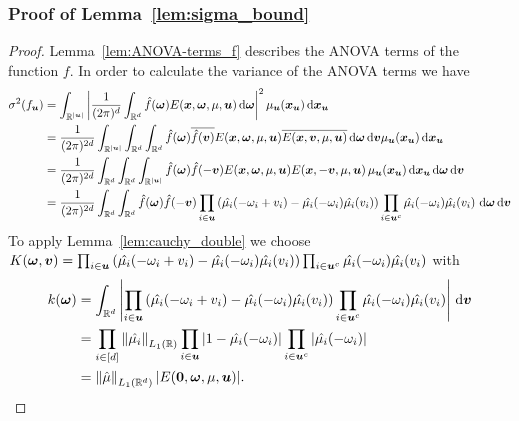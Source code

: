 \documentclass{article}
\renewcommand{\vec}[1]{\ensuremath \mathbf{\boldsymbol{#1}}}
\newcommand{\w}{\ensuremath{\vec \omega}}
\newcommand{\x}{\ensuremath{\vec x}}
\newcommand{\R}{\ensuremath{\mathbb{R}}}
\renewcommand{\d}{\, \mathrm{d}}
\newcommand{\norm}[1]{\left\lVert {#1} \right\rVert}    %
\theoremstyle{definition}
\numberwithin{equation}{section}
\begin{document}
\subsubsection*{Proof of Lemma~\ref{lem:sigma_bound}}
\begin{proof}
Lemma~\ref{lem:ANOVA-terms_f} describes the ANOVA terms of the function $f$. In order to calculate the variance of the ANOVA terms we have
\begin{align*}
\sigma^2(f_{\vec u})
&= \int_{\R^{|\vec u|}}\left|\frac{1}{(2\pi)^d}\int_{\R^d} \hat{f}(\w) E(\x,\w,\mu, \vec u) \d \w\right|^2 \mu_{\vec u}(\vec x_{\vec u})\d \vec x_{\vec u}\\
&=\frac{1}{(2\pi)^{2d}}\int_{\R^{|\vec u|}}\int_{\R^d} \int_{\R^d}\hat{f}(\w)\overline{\hat{f}(\vec v)} E(\x,\w,\mu, \vec u)   \overline{E(\x,\vec v,\mu, \vec u)}\d \w \d \vec v \mu_{\vec u}(\vec x_{\vec u})\d \vec x_{\vec u}\\
&=\frac{1}{(2\pi)^{2d}}\int_{\R^{d}}\int_{\R^d} \int_{\R^{|\vec u|}}\hat{f}(\w)\hat{f}(-\vec v) E(\x,\w,\mu, \vec u)  E(\x,-\vec v,\mu, \vec u)\,\mu_{\vec u}(\vec x_{\vec u})\d \vec x_{\vec u} \d \w \d \vec v \\
&=\frac{1}{(2\pi)^{2d}}\int_{\R^d}\int_{\R^d} \hat{f}(\w)\hat{f}(-\vec v) 
\prod_{i\in \vec u} \left( \hat{\mu_i}(-\omega_i+v_i) -\hat{\mu_i}(-\omega_i)\hat{\mu_i}(v_i) \right)\prod_{i\in \vec u^c} \hat{\mu_i}(-\omega_i)\hat{\mu_i}(v_i)\, \d \w \d \vec v
\end{align*}
To apply Lemma~\ref{lem:cauchy_double} we choose 
$K(\w,\vec v) = \prod_{i\in \vec u} \left( \hat{\mu_i}(-\omega_i+v_i) -\hat{\mu_i}(-\omega_i)\hat{\mu_i}(v_i) \right)\prod_{i\in \vec u^c} \hat{\mu_i}(-\omega_i)\hat{\mu_i}(v_i)$
with 
\begin{align*}
k(\w) &= \int_{\R^d} \left|\prod_{i\in \vec u} \left( \hat{\mu_i}(-\omega_i+v_i) -\hat{\mu_i}(-\omega_i)\hat{\mu_i}(v_i) \right)\prod_{i\in \vec u^c} \hat{\mu_i}(-\omega_i)\hat{\mu_i}(v_i)\right| \d\vec v\\
&= \prod_{i\in [d]} \norm{\hat{\mu_i}}_{L_1(\R)} \prod_{i\in \vec  u}\left|1-\hat{\mu_i}(-\omega_i)\right| \prod_{i\in \vec  u^c}\left|\hat{\mu_i}(-\omega_i)\right|\\
&= \norm{\hat{\mu}}_{L_1(\R^d)}|E(\vec 0,\w,\mu,\vec u)|.
\qedhere 
\end{align*}
\end{proof}
\end{document}
